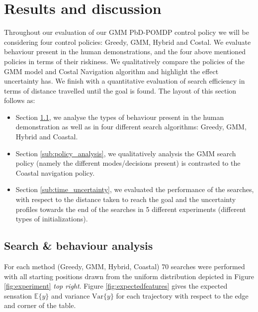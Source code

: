 \section{Results and discussion}\label{chap3:results}

Throughout our evaluation of our GMM PbD-POMDP control policy we will be considering four control policies: Greedy, GMM, Hybrid and 
Costal. We evaluate behaviour present in the human demonstrations, and the four above mentioned policies in terms 
of their riskiness. We qualitatively compare the policies of the GMM model and Costal Navigation algorithm and highlight the 
effect uncertainty has. We finish with a quantitative evaluation of search efficiency in terms of distance travelled until the goal is found.
The layout of this section follows as:
\begin{itemize}
 \item Section \ref{sub:search_behaviour}, we analyse the types of behaviour present in the human demonstration as well as in
four different search algorithms: Greedy, GMM, Hybrid and Coastal.
 \item Section \ref{sub:policy_analysis}, we qualitatively analysis the GMM search policy (namely the different modes/decisions present) 
 is contrasted to the Coastal navigation policy.
 \item Section \ref{sub:time_uncertainty}, we evaluated the performance of the searches, with respect to the distance taken to reach the goal and the uncertainty profiles towards the end of 
the searches in 5 different experiments (different types of initializations). 
\end{itemize}

\subsection{Search \& behaviour analysis}\label{sub:search_behaviour}

For each method (Greedy, GMM, Hybrid, Coastal) 70 searches were performed with all starting positions drawn from the
uniform distribution depicted in Figure \ref{fig:experiment} \textit{top right}. Figure \ref{fig:expectedfeatures} 
gives the expected sensation $\mathbb{E}\{y\}$ and  variance $\mathrm{Var}\{y\}$ for each trajectory with respect 
to the edge and corner of the table. 


